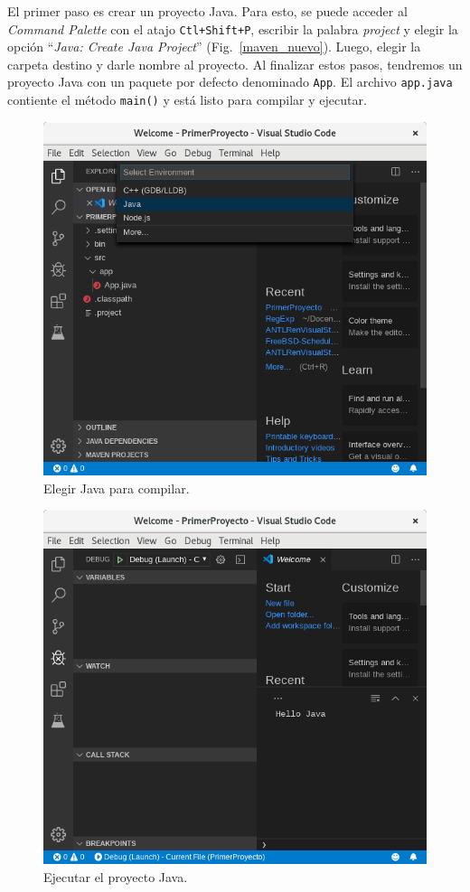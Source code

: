 \documentclass[a5paper,10pt]{article}
\begin{document}
El primer paso es crear un proyecto Java.  Para esto, se puede acceder al \emph{Command Palette} con el atajo \verb|Ctl+Shift+P|, escribir la palabra \emph{project} y elegir la opción ``\emph{Java: Create Java Project}'' (Fig.~\ref{maven_nuevo}). Luego, elegir la carpeta destino y darle nombre al proyecto.  Al finalizar estos pasos, tendremos un proyecto Java con un paquete por defecto denominado \verb|App|.  El archivo \verb|app.java| contiente el método \verb|main()| y está listo para compilar y ejecutar.


\begin{figure}[t]
	\centering
	\includegraphics[width=.95\textwidth]{img/PrimerCompilacion}
	\caption{Elegir Java para compilar.}
	\label{java_project}
\end{figure}

\begin{figure}[t]
	\centering
	\includegraphics[width=.95\textwidth]{img/PrimeraEjecucion}
	\caption{Ejecutar el proyecto Java.}
	\label{hello_java}
\end{figure}
\end{document}
